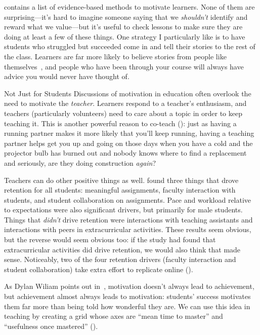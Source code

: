 \cite{Ambr2010} contains a list of evidence-based methods to motivate learners.
None of them are surprising---it's
hard to imagine someone saying that we \emph{shouldn't} identify and reward what we value---but
it's useful to check lessons to make sure they are doing at least a few of these things.
One strategy I particularly like is
to have students who struggled but succeeded
come in and tell their stories to the rest of the class.
Learners are far more likely to believe stories from people like themselves~\cite{Mill2016a},
and people who have been through your course
will always have advice you would never have thought of.

\begin{aside}{Not Just for Students}
  Discussions of motivation in education often overlook the need to motivate the \emph{teacher}.
  Learners respond to a teacher's enthusiasm,
  and teachers (particularly volunteers) need to care about a topic in order to keep teaching it.
  This is another powerful reason to co-teach ():
  just as having a running partner makes it more likely that you'll keep running,
  having a teaching partner helps get you up and going on
  those days when you have a cold
  and the projector bulb has burned out
  and nobody knows where to find a replacement
  and seriously,
  are they doing construction \emph{again}?
\end{aside}

Teachers can do other positive things as well.
\cite{Bark2014} found three things that drove retention for all students:
meaningful assignments,
faculty interaction with students,
and student collaboration on assignments.
Pace and workload relative to expectations were also significant drivers,
but primarily for male students.
Things that \emph{didn't} drive retention
were interactions with teaching assistants
and interactions with peers in extracurricular activities.
These results seem obvious,
but the reverse would seem obvious too:
if the study had found that extracurricular activities did drive retention,
we would also think that made sense.
Noticeably,
two of the four retention drivers (faculty interaction and student collaboration)
take extra effort to replicate online ().


As Dylan Wiliam points out in~\cite{Hend2017},
motivation doesn't always lead to achievement,
but achievement almost always leads to motivation:
students' success motivates them far more than being told how wonderful they are.
We can use this idea in teaching
by creating a grid whose axes are ``mean time to master''
and ``usefulness once mastered'' ().

